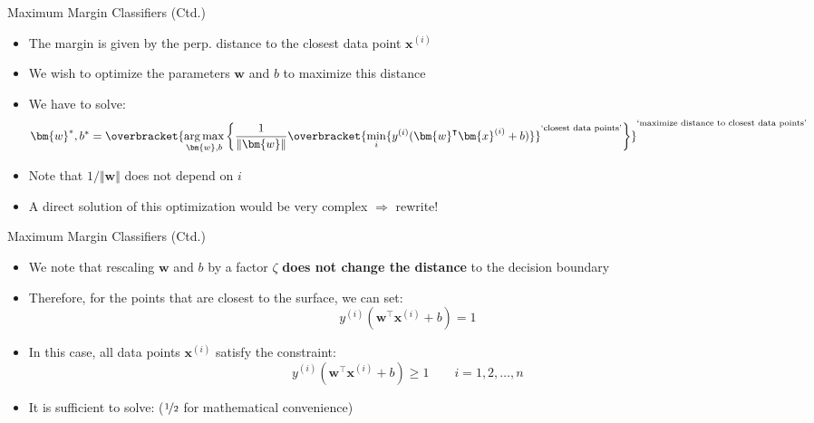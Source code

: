 \begin{frame}{Maximum Margin Classifiers (Ctd.)}{}
	\begin{itemize}
		\item The margin is given by the perp. distance to the closest data point $\bm{x}^{(i)}$
		\item We wish to optimize the parameters $\bm{w}$ and $b$ to maximize this distance
		\item We have to solve:
		\vspace*{-3.5mm}
		\begin{equation}
			\bm{w}^*, b^* =
			\overbracket{
				\argmax_{\bm{w}, b} \left\{ \frac{1}{\Vert \bm{w} \Vert}
				\overbracket{
					\min_i \{y^{(i)} (\bm{w}^{\intercal} \bm{x}^{(i)} + b)\}
				}^{\text{`closest data points'}}
				\right\}
			}^{\text{`maximize distance to closest data points'}}
		\end{equation}
		\vspace*{-3.5mm}
		\item Note that $1/\Vert \bm{w} \Vert$ does not depend on $i$
		\item A direct solution of this optimization would be very complex $\Rightarrow$ rewrite!
	\end{itemize}
\end{frame}


\begin{frame}{Maximum Margin Classifiers (Ctd.)}{}
	\begin{itemize}
		\item We note that rescaling $\bm{w}$ and $b$ by a factor $\zeta$
			\textbf{does not change the distance} to the decision boundary
		\item Therefore, for the points that are closest to the surface, we can set:
		\begin{equation}
			y^{(i)} (\bm{w}^{\intercal} \bm{x}^{(i)} + b) = 1
		\end{equation}
		\item In this case, all data points $\bm{x}^{(i)}$ satisfy the constraint:
		\begin{equation}
			y^{(i)} (\bm{w}^{\intercal} \bm{x}^{(i)} + b) \ge 1 \qquad i = 1, 2, \dots, n
		\end{equation}
		\item It is sufficient to solve: 
			\footnotesize ($\nicefrac{1}{2}$ for mathematical convenience) \normalsize
	\end{itemize}
\end{frame}


